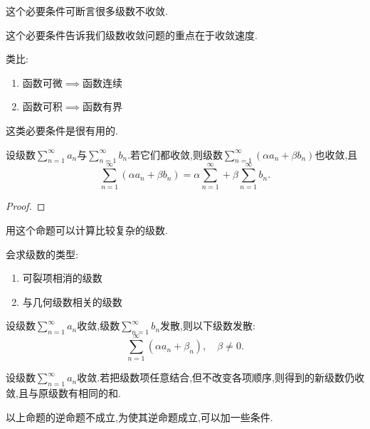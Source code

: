 这个必要条件可断言很多级数不收敛.

\begin{remark}
    这个必要条件告诉我们级数收敛问题的重点在于收敛速度.
\end{remark}

\begin{note}
    类比:
    \begin{enumerate}
        \item 函数可微$\implies$函数连续
        \item 函数可积$\implies$函数有界
    \end{enumerate}
    这类必要条件是很有用的.
\end{note}

\begin{proposition}[级数的线性性质]
    设级数$\sum_{n=1}^\infty a_n$与$\sum_{n=1}^\infty b_n$.若它们都收敛,则级数$\sum_{n=1}^\infty(\alpha a_n+\beta b_n)$也收敛,且
    \[\sum_{n=1}^\infty(\alpha a_n+\beta b_n)=\alpha\sum_{n=1}^\infty+\beta\sum_{n=1}^\infty b_n.\]
\end{proposition}

\begin{proof}%
    
\end{proof}

\begin{remark}
    用这个命题可以计算比较复杂的级数.
\end{remark}

\begin{note}
    会求级数的类型:
    \begin{enumerate}
        \item 可裂项相消的级数
        \item 与几何级数相关的级数
    \end{enumerate}
\end{note}

\begin{corollary}
    设级数$\sum_{n=1}^\infty a_n$收敛,级数$\sum_{n=1}^\infty b_n$发散,则以下级数发散:
    \[\sum_{n=1}^\infty(\alpha a_n+\beta_n),\quad\beta\ne 0.\]
\end{corollary}

\begin{proposition}[级数的结合性]
    设级数$\sum_{n=1}^\infty a_n$收敛.若把级数项任意结合,但不改变各项顺序,则得到的新级数仍收敛,且与原级数有相同的和.
\end{proposition}

以上命题的逆命题不成立,为使其逆命题成立,可以加一些条件.

